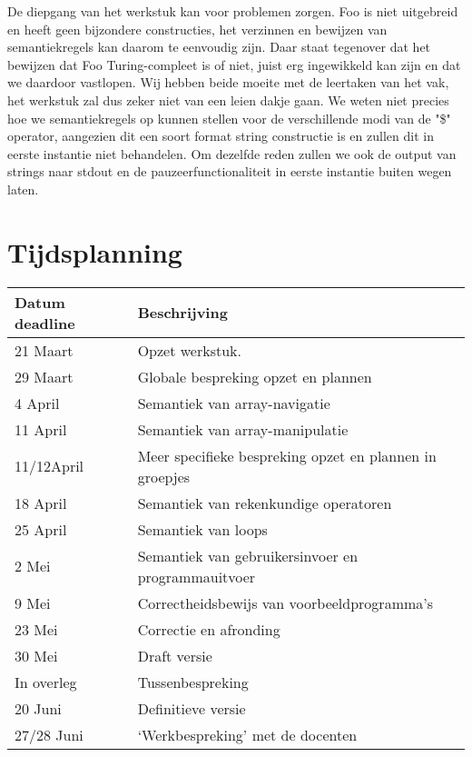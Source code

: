 \documentclass[11pt]{article}
\begin{document}
De diepgang van het werkstuk kan voor problemen zorgen. 
Foo is niet uitgebreid en heeft geen bijzondere constructies, het verzinnen en bewijzen van semantiekregels kan daarom te eenvoudig zijn. 
Daar staat tegenover dat het bewijzen dat Foo Turing-compleet is of niet, juist erg ingewikkeld kan zijn en dat we daardoor vastlopen.
\newline
Wij hebben beide moeite met de leertaken van het vak, het werkstuk zal dus zeker niet van een leien dakje gaan.
\newline
We weten niet precies hoe we semantiekregels op kunnen stellen voor de verschillende modi van de "\$" operator, aangezien dit een soort format string constructie is en zullen dit in eerste instantie niet behandelen. %
Om dezelfde reden zullen we ook de output van strings naar stdout en de pauzeerfunctionaliteit in eerste instantie buiten wegen laten.

\section{Tijdsplanning}

\begin{center}
    \begin{tabular}{ | l | p{15cm} |}
    \hline
    Datum deadline & Beschrijving \\ \hline
    21 Maart   & Opzet werkstuk. \\ \hline
    29 Maart   & Globale bespreking opzet en plannen \\ \hline
    4 April    & Semantiek van array-navigatie \\ \hline
    11 April   & Semantiek van array-manipulatie \\ \hline
    11/12April & Meer specifieke bespreking opzet en plannen in groepjes \\ \hline
    18 April   & Semantiek van rekenkundige operatoren \\ \hline
    25 April   & Semantiek van loops \\ \hline
    2 Mei      & Semantiek van gebruikersinvoer en programmauitvoer \\ \hline
    9 Mei      & Correctheidsbewijs van voorbeeldprogramma's \\ \hline
    23 Mei     & Correctie en afronding \\ \hline
    30 Mei     & Draft versie \\ \hline
    In overleg & Tussenbespreking \\ \hline
    20 Juni    & Definitieve versie \\ \hline
    27/28 Juni & `Werkbespreking' met de docenten \\ \hline
    \hline
    \end{tabular}
\end{center}


%
\end{document}
